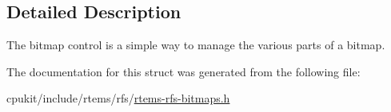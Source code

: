 \subsection{Detailed Description}
The bitmap control is a simple way to manage the various parts of a bitmap. 

The documentation for this struct was generated from the following file\+:\begin{DoxyCompactItemize}
\item 
cpukit/include/rtems/rfs/\mbox{\hyperlink{rtems-rfs-bitmaps_8h}{rtems-\/rfs-\/bitmaps.\+h}}\end{DoxyCompactItemize}
